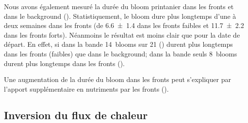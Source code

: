Nous avons également mesuré la durée du bloom printanier dans les fronts et dans le background ().
Statistiquement, le bloom dure plus longtemps d'une à deux semaines dans les fronts (de \qty{6.6 \pm 1.4}{\jours} dans les fronts faibles et \qty{11.7 \pm 2.2}{\jours} dans les fronts forts).
Néanmoins le résultat est moins clair que pour la date de départ.
En effet, si dans la bande  14~blooms sur 21 () durent plus longtemps dans les fronts (faibles) que dans le background; dans la bande  seuls 8~blooms durent plus longtemps dans les fronts ().

\begin{figure}
  \centering
  \label{fig:duree-bloom}
\end{figure}

Une augmentation de la durée du bloom dans les fronts peut s'expliquer par l'apport supplémentaire en nutriments par les fronts ().

\subsection{Inversion du flux de chaleur}
\label{sec:flux-chaleur}
